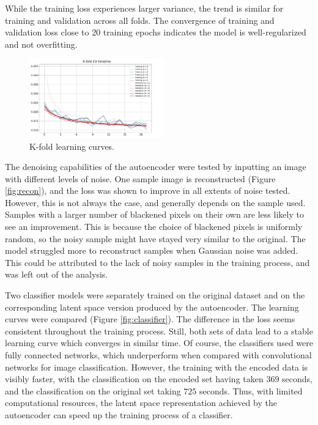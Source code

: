 \documentclass[11pt]{article} %
\begin{document}
While the training loss experiences larger variance, the trend is similar for training and validation across all folds. The convergence of training and validation loss close to 20 training epochs indicates the model is well-regularized and not overfitting.

\begin{figure}
    \centering
    \includegraphics[width=0.52\textwidth]{res/learning_curve_KFCV.pdf}
    \caption{K-fold learning curves.}
    \label{fig:kfold}
\end{figure}

\noindent The denoising capabilities of the autoencoder were tested by inputting an image with different levels of noise. One sample image is reconstructed (Figure \ref{fig:recon}), and the loss was shown to improve in all extents of noise tested. However, this is not always the case, and generally depends on the sample used. Samples with a larger number of blackened pixels on their own are less likely to see an improvement. This is because the choice of blackened pixels is uniformly random, so the noisy sample might have stayed very similar to the original. The model struggled more to reconstruct samples when Gaussian noise was added. This could be attributed to the lack of noisy samples in the training process, and was left out of the analysis.

\noindent Two classifier models were separately trained on the original dataset and on the corresponding latent space version produced by the autoencoder. The learning curves were compared (Figure \ref{fig:classifier}). The difference in the loss seems consistent throughout the training process. Still, both sets of data lead to a stable learning curve which converges in similar time. Of course, the classifiers used were fully connected networks, which underperform when compared with convolutional networks for image classification. However, the training with the encoded data is visibly faster, with the classification on the encoded set having taken $369$ seconds, and the classification on the original set taking $725$ seconds. Thus, with limited computational resources, the latent space representation achieved by the autoencoder can speed up the training process of a classifier.
\end{document}
